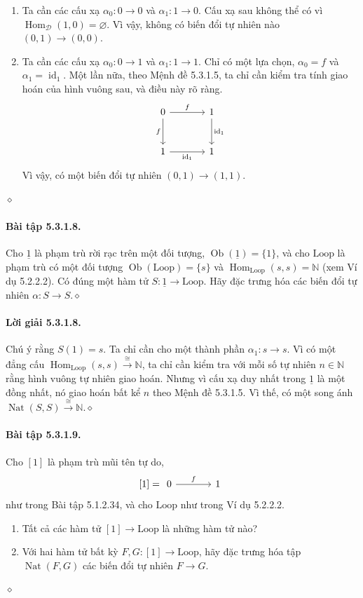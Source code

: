 \begin{enumerate}[label=\alph*.]
\[\begin{tikzcd}[column sep=large,row sep=large]
\end{tikzcd}\]
\item Ta cần các cấu xạ $\alpha_0:0\to0$ và $\alpha_1:1\to0$. Cấu xạ sau không thể có vì $\operatorname{Hom}_{\mathcal D}(1,0)=\varnothing$. Vì vậy, không có biến đổi tự nhiên nào $(0,1)\to(0,0)$.
\item Ta cần các cấu xạ $\alpha_0:0\to1$ và $\alpha_1:1\to1$. Chỉ có một lựa chọn, $\alpha_0=f$ và $\alpha_1=\operatorname{id}_1$. Một lần nữa, theo Mệnh đề 5.3.1.5, ta chỉ cần kiểm tra tính giao hoán của hình vuông sau, và điều này rõ ràng.
\[\begin{tikzcd}[column sep=large,row sep=large]
0\arrow[r,"f"]\arrow[d,"f"']&1\arrow[d,"\operatorname{id}_1"]\\1\arrow[r,"\operatorname{id}_1"']&1
\end{tikzcd}\]
Vì vậy, có một biến đổi tự nhiên $(0,1)\to(1,1)$.
\end{enumerate}\hfill$\diamond$
\paragraph{Bài tập 5.3.1.8.} Cho $\underline{1}$ là phạm trù rời rạc trên một đối tượng, $\operatorname{Ob}(\underline{1})=\{1\}$, và cho $\mathrm{Loop}$ là phạm trù có một đối tượng $\operatorname{Ob}(\mathrm{Loop})=\{s\}$ và $\operatorname{Hom}_{\mathrm{Loop}}(s,s)=\mathbb N$ (xem Ví dụ 5.2.2.2). Có đúng một hàm tử $S:\underline{1}\to\mathrm{Loop}$. Hãy đặc trưng hóa các biến đổi tự nhiên $\alpha:S\to S$.\hfill$\diamond$
\paragraph{Lời giải 5.3.1.8.} Chú ý rằng $S(1)=s$. Ta chỉ cần cho một thành phần $\alpha_1:s\to s$. Vì có một đẳng cấu $\operatorname{Hom}_{\mathrm{Loop}}(s,s)\xrightarrow{\cong}\mathbb N$, ta chỉ cần kiểm tra với mỗi số tự nhiên $n\in\mathbb N$ rằng hình vuông tự nhiên giao hoán. Nhưng vì cấu xạ duy nhất trong $\underline{1}$ là một đồng nhất, nó giao hoán bất kể $n$ theo Mệnh đề 5.3.1.5. Vì thế, có một song ánh $\operatorname{Nat}(S,S)\xrightarrow{\cong}\mathbb N$.\hfill$\diamond$
\paragraph{Bài tập 5.3.1.9.} Cho $[1]$ là phạm trù mũi tên tự do,
\[[1]=\begin{tikzcd}[column sep=large]0\arrow[r,"f"]&1\end{tikzcd}\]
như trong Bài tập 5.1.2.34, và cho $\mathrm{Loop}$ như trong Ví dụ 5.2.2.2.
\begin{enumerate}[label=\alph*.]
\item Tất cả các hàm tử $[1]\to\mathrm{Loop}$ là những hàm tử nào?
\item Với hai hàm tử bất kỳ $F,G:[1]\to\mathrm{Loop}$, hãy đặc trưng hóa tập $\operatorname{Nat}(F,G)$ các biến đổi tự nhiên $F\to G$.
\end{enumerate}\hfill$\diamond$
